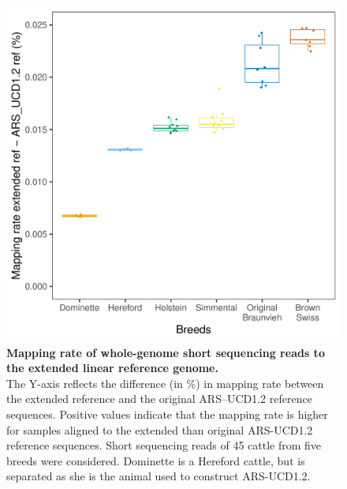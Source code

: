 \documentclass[../main.tex]{subfiles}
\begin{document}
\begin{flushleft}
\newpage

\begin{figure}[!htb]
    \centering
    \includegraphics[width=\textwidth]{paper3/supplement/sp412.pdf}
    \caption[WGS mapping improvement to pangenome]{\textbf{Mapping rate of whole-genome short sequencing reads to the extended linear reference genome. } \\
    \small{The Y-axis reflects the difference (in \%) in mapping rate between the extended reference and the original ARS–UCD1.2 reference sequences. Positive values indicate that the mapping rate is higher for samples aligned to the extended than original ARS-UCD1.2 reference sequences. Short sequencing reads of 45 cattle from five breeds were considered. Dominette is a Hereford cattle, but is separated as she is the animal used to construct ARS-UCD1.2.}}
    \label{sup_fig:s412}
\end{figure}

\newpage


\end{flushleft}
\end{document}
